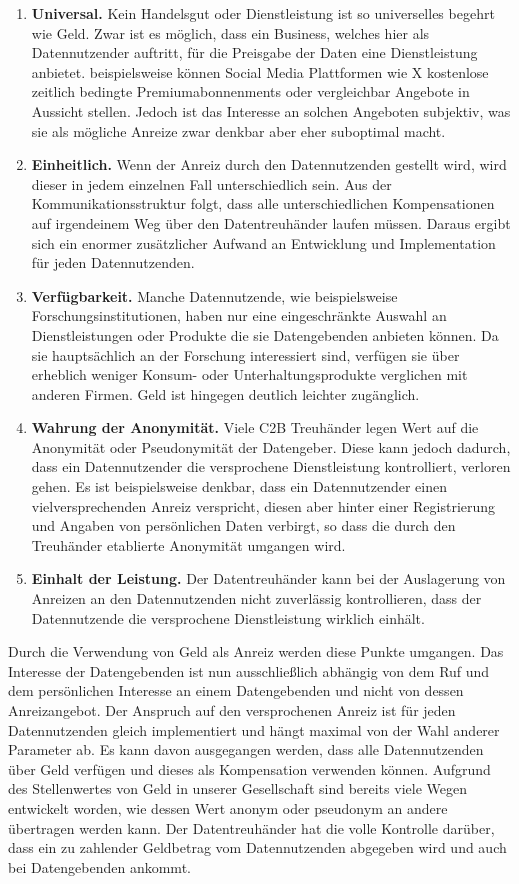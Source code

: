 \documentclass{scrreprt}
\begin{document}
\begin{enumerate}
    \item \textbf{Universal.} Kein Handelsgut oder Dienstleistung ist so universelles begehrt wie Geld. Zwar ist es möglich, dass ein Business, welches hier als Datennutzender auftritt, für die Preisgabe der Daten eine Dienstleistung anbietet. beispielsweise können Social Media Plattformen wie X kostenlose zeitlich bedingte Premiumabonnenments oder vergleichbar Angebote in Aussicht stellen. Jedoch ist das Interesse an solchen Angeboten subjektiv, was sie als mögliche Anreize zwar denkbar aber eher suboptimal macht.
    \item \textbf{Einheitlich.} Wenn der Anreiz durch den Datennutzenden gestellt wird, wird dieser in jedem einzelnen Fall unterschiedlich sein. Aus der Kommunikationsstruktur folgt, dass alle unterschiedlichen Kompensationen auf irgendeinem Weg über den Datentreuhänder laufen müssen. Daraus ergibt sich ein enormer zusätzlicher Aufwand an Entwicklung und Implementation für jeden Datennutzenden.
    \item \textbf{Verfügbarkeit.} Manche Datennutzende, wie beispielsweise Forschungsinstitutionen, haben nur eine eingeschränkte Auswahl an Dienstleistungen oder Produkte die sie Datengebenden anbieten können. Da sie hauptsächlich an der Forschung interessiert sind, verfügen sie über erheblich weniger Konsum- oder Unterhaltungsprodukte verglichen mit anderen Firmen. Geld ist hingegen deutlich leichter zugänglich.
    \item \textbf{Wahrung der Anonymität.} Viele C2B Treuhänder legen Wert auf die Anonymität oder Pseudonymität der Datengeber. Diese kann jedoch dadurch, dass ein Datennutzender die versprochene Dienstleistung kontrolliert, verloren gehen. Es ist beispielsweise denkbar, dass ein Datennutzender einen vielversprechenden Anreiz verspricht, diesen aber hinter einer Registrierung und Angaben von persönlichen Daten verbirgt, so dass die durch den Treuhänder etablierte Anonymität umgangen wird.
    \item \textbf{Einhalt der Leistung.} Der Datentreuhänder kann bei der Auslagerung von Anreizen an den Datennutzenden nicht zuverlässig kontrollieren, dass der Datennutzende die versprochene Dienstleistung wirklich einhält.
\end{enumerate}
Durch die Verwendung von Geld als Anreiz werden diese Punkte umgangen. Das Interesse der Datengebenden ist nun ausschließlich abhängig von dem Ruf und dem persönlichen Interesse an einem Datengebenden und nicht von dessen Anreizangebot. Der Anspruch auf den versprochenen Anreiz ist für jeden Datennutzenden gleich implementiert und hängt maximal von der Wahl anderer Parameter ab. Es kann davon ausgegangen werden, dass alle Datennutzenden über Geld verfügen und dieses als Kompensation verwenden können. Aufgrund des Stellenwertes von Geld in unserer Gesellschaft sind bereits viele Wegen entwickelt worden, wie dessen Wert anonym oder pseudonym an andere übertragen werden kann. Der Datentreuhänder hat die volle Kontrolle darüber, dass ein zu zahlender Geldbetrag vom Datennutzenden abgegeben wird und auch bei Datengebenden ankommt.
\end{document}
